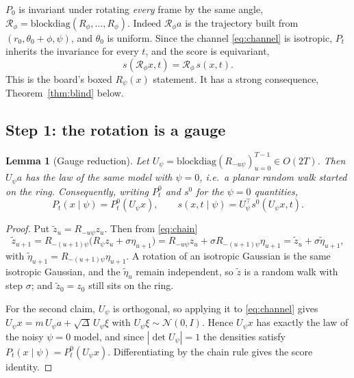 \documentclass[11pt]{article}
\theoremstyle{plain}
\newtheorem{lemma}{Lemma}
\theoremstyle{remark}
\newcommand{\N}{\mathcal{N}}
\newcommand{\T}{^{\!\top}}
\newcommand{\score}{s}
\begin{document}
$P_0$ is invariant under rotating \emph{every} frame by the same angle,
$\mathcal{R}_\phi = \mathrm{blockdiag}(R_\phi, \dots, R_\phi)$. Indeed
$\mathcal{R}_\phi a$ is the trajectory built from
$(r_0, \theta_0 + \phi, \psi)$, and $\theta_0$ is uniform. Since the channel
\eqref{eq:channel} is isotropic, $P_t$ inherits the invariance for every $t$,
and the score is equivariant,
\begin{equation}
  \score(\mathcal{R}_\phi x, t) = \mathcal{R}_\phi\, \score(x, t).
  \label{eq:equivariance}
\end{equation}
This is the board's boxed $R_\psi(x)$ statement. It has a strong consequence,
Theorem~\ref{thm:blind} below.

\subsection{Step 1: the rotation is a gauge}

\begin{lemma}[Gauge reduction]\label{lem:gauge}
Let $U_\psi = \mathrm{blockdiag}(R_{-u\psi})_{u=0}^{T-1} \in O(2T)$. Then
$U_\psi a$ has the law of the same model with $\psi = 0$, i.e.\ a planar random
walk started on the ring. Consequently, writing $P_t^0$ and $\score^0$ for the
$\psi = 0$ quantities,
\begin{equation}
  P_t(x \mid \psi) = P_t^0(U_\psi x), \qquad
  \score(x, t \mid \psi) = U_\psi\T \score^0(U_\psi x, t).
  \label{eq:gauge}
\end{equation}
\end{lemma}

\begin{proof}
Put $\tilde z_u = R_{-u\psi} z_u$. Then from \eqref{eq:chain}
\begin{equation}
  \tilde z_{u+1}
  = R_{-(u+1)\psi}\bigl(R_\psi z_u + \sigma \eta_{u+1}\bigr)
  = R_{-u\psi} z_u + \sigma R_{-(u+1)\psi}\eta_{u+1}
  = \tilde z_u + \sigma \tilde\eta_{u+1},
\end{equation}
with $\tilde\eta_{u+1} = R_{-(u+1)\psi}\eta_{u+1}$. A rotation of an isotropic
Gaussian is the same isotropic Gaussian, and the $\tilde\eta_u$ remain
independent, so $\tilde z$ is a random walk with step $\sigma$; and
$\tilde z_0 = z_0$ still sits on the ring.

For the second claim, $U_\psi$ is orthogonal, so applying it to
\eqref{eq:channel} gives
$U_\psi x = m\,U_\psi a + \sqrt{\Delta}\,U_\psi \xi$ with
$U_\psi \xi \sim \N(0, I)$. Hence $U_\psi x$ has exactly the law of the noisy
$\psi = 0$ model, and since $|\det U_\psi| = 1$ the densities satisfy
$P_t(x \mid \psi) = P_t^0(U_\psi x)$. Differentiating by the chain rule gives
the score identity.
\end{proof}
\end{document}
